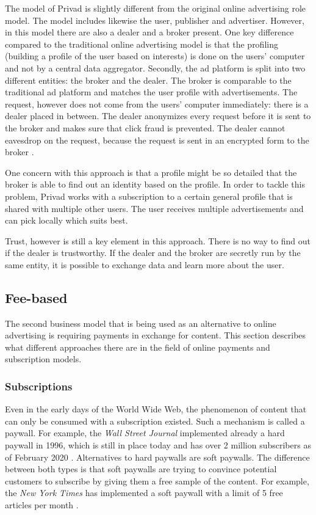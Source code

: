 The model of Privad is slightly different from the original online advertising role model. The model includes likewise the user, publisher and advertiser. However, in this model there are also a dealer and a broker present. One key difference compared to the traditional online advertising model is that the profiling (building a profile of the user based on interests) is done on the users' computer and not by a central data aggregator. Secondly, the ad platform is split into two different entities: the broker and the dealer. The broker is comparable to the traditional ad platform and matches the user profile with advertisements. The request, however does not come from the users' computer immediately: there is a dealer placed in between. The dealer anonymizes every request before it is sent to the broker and makes sure that click fraud is prevented. The dealer cannot eavesdrop on the request, because the request is sent in an encrypted form to the broker \cite{guha2011privad}.

One concern with this approach is that a profile might be so detailed that the broker is able to find out an identity based on the profile. In order to tackle this problem, Privad works with a subscription to a certain general profile that is shared with multiple other users. The user receives multiple advertisements and can pick locally which suits best.

Trust, however is still a key element in this approach. There is no way to find out if the dealer is trustworthy. If the dealer and the broker are secretly run by the same entity, it is possible to exchange data and learn more about the user.

\subsection{Fee-based}

The second business model that is being used as an alternative to online advertising is requiring payments in exchange for content. This section describes what different approaches there are in the field of online payments and subscription models.

\subsubsection{Subscriptions}

Even in the early days of the World Wide Web, the phenomenon of content that can only be consumed with a subscription existed. Such a mechanism is called a paywall. For example, the \textit{Wall Street Journal} implemented already a hard paywall in 1996, which is still in place today and has over 2 million subscribers as of February 2020 \cite{firstpaywall}.
Alternatives to hard paywalls are soft paywalls. The difference between both types is that soft paywalls are trying to convince potential customers to subscribe by giving them a free sample of the content. For example, the \textit{New York Times} has implemented a soft paywall with a limit of 5 free articles per month \cite{cook2012paying}.

